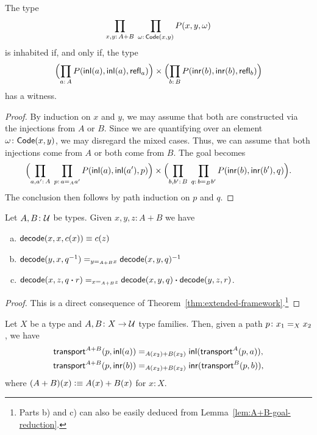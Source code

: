 \begin{lem}\label{lem:A+B-goal-reduction}
    The type
    \[
        \prod_{x,y\colon A+B}\;
        \prod_{\omega\colon\fun{Code}(x,y)}
        P(x,y,\omega)
    \]
    is inhabited if, and only if, the type
    \[
        \Bigl(
            \prod_{a\colon A}P(\fun{inl}(a),\fun{inl}(a),\fun{refl}_a)
        \Bigr)
        \times
        \Bigl(
            \prod_{b\colon B}P(\fun{inr}(b),\fun{inr}(b),\fun{refl}_b)
        \Bigr)
    \]
    has a witness.
\end{lem}

\begin{proof}
    By induction on\/ $x$ and\/ $y$, we may assume that both are constructed via the injections from\/ $A$ or\/ $B$. Since we are quantifying over an element\/ $\omega\colon\fun{Code}(x,y)$, we may disregard the mixed cases. Thus, we can assume that both injections come from\/ $A$ or both come from\/ $B$. The goal becomes
    \[
        \Bigl(\prod_{a,a'\colon A}\;
        \prod_{p\colon a\eq{A}a'}
        P(\fun{inl}(a),\fun{inl}(a'),p)\Bigr)
        \times
        \Bigl(\prod_{b,b'\colon B}\;\prod_{q\colon b\eq{B}b'}
        P(\fun{inr}(b),\fun{inr}(b'),q)\Bigr).
    \]
    The conclusion then follows by path induction on\/ $p$ and\/ $q$.
\end{proof}

\begin{prop}
    Let $A,B\colon\univ$ be types. Given $x,y,z\colon A+B$ we have
    \begin{enumerate}[a),font=\upshape]
        \item $\mathsf{decode}(x,x,c(x))\equiv c(z)$
        \item $\mathsf{decode}(y,x,q^{-1})\mathrel{=_{y\mathrel{=_{A+B}}x}}\mathsf{decode}(x,y,q)^{-1}$
        \item $\mathsf{decode}(x,z,q\mathbin{\boldsymbol{\cdot}} r)\mathrel{=_{x\mathrel{=_{A+B}}z}}\mathsf{decode}(x,y,q)\mathbin{\boldsymbol{\cdot}}\mathsf{decode}(y,z,r)$.
    \end{enumerate}
\end{prop}

\begin{proof}
    This is a direct consequence of Theorem~\ref{thm:extended-framework}.\footnote{Parts b) and c) can also be easily deduced from Lemma~\ref{lem:A+B-goal-reduction}.}
\end{proof}

\begin{thm}
    Let\/ $X$ be a type and\/ $A,B\colon X\to\univ$ type families. Then, given a path\/ $p\colon x_1\eq{X}x_2$, we have
    \begin{align*}
        \mathsf{transport}^{A+B}(p,\mathsf{inl}(a))
            &\mathrel{=_{A(x_2)+B(x_2)}}\mathsf{inl}(\mathsf{transport}^A(p,a)),\\
        \mathsf{transport}^{A+B}(p,\mathsf{inr}(b))
            &\mathrel{=_{A(x_2)+B(x_2)}}\mathsf{inr}(\mathsf{transport}^B(p,b)),
    \end{align*}
    where $(A+B)(x)\mathrel{\vcentcolon}\equiv A(x)+B(x)$ for $x\colon X$.
    
\end{thm}

